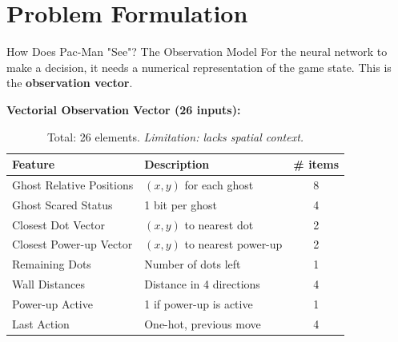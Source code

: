 \section{Problem Formulation}

\begin{frame}{How Does Pac-Man "See"? The Observation Model}
	For the neural network to make a decision, it needs a numerical representation of the game state. This is the \textbf{observation vector}.
	\vspace{1em}
	
	\textbf{Vectorial Observation Vector (26 inputs):}
	
	\begin{table}[h!]
	\centering
	\begin{tabular}{|l|l|c|}
	\hline
	\textbf{Feature} & \textbf{Description} & \textbf{\# items} \\
	\hline
	Ghost Relative Positions & $(x, y)$ for each ghost          & 8 \\
	Ghost Scared Status      & 1 bit per ghost                  & 4 \\
	Closest Dot Vector       & $(x, y)$ to nearest dot          & 2 \\
	Closest Power-up Vector  & $(x, y)$ to nearest power-up     & 2 \\
	Remaining Dots           & Number of dots left              & 1 \\
	Wall Distances           & Distance in 4 directions         & 4 \\
	Power-up Active          & 1 if power-up is active          & 1 \\
	Last Action              & One-hot, previous move           & 4 \\
	\hline
	\end{tabular}
	\caption{Total: 26 elements. \textit{Limitation: lacks spatial context.}}
	\end{table}
\end{frame}


